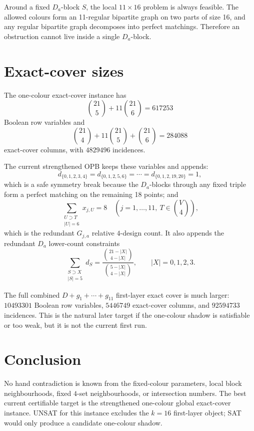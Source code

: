 \documentclass[11pt]{article}
\newcommand{\binomV}[2]{\binom{#1}{#2}}
\begin{document}
Around a fixed \(D_a\)-block \(S\), the local \(11\times16\) problem is always
feasible.  The allowed colours form an 11-regular bipartite graph on two parts
of size 16, and any regular bipartite graph decomposes into perfect matchings.
Therefore an obstruction cannot live inside a single \(D_a\)-block.

\section*{Exact-cover sizes}

The one-colour exact-cover instance has
\[
  \binom{21}{5}+11\binom{21}{6}=617253
\]
Boolean row variables and
\[
  \binom{21}{4}+11\binom{21}{5}+\binom{21}{6}=284088
\]
exact-cover columns, with \(4829496\) incidences.

The current strengthened OPB keeps these variables and appends:
\[
  d_{\{0,1,2,3,4\}}=
  d_{\{0,1,2,5,6\}}=\cdots=
  d_{\{0,1,2,19,20\}}=1,
\]
which is a safe symmetry break because the \(D_a\)-blocks through any fixed
triple form a perfect matching on the remaining 18 points; and
\[
  \sum_{\substack{U\supset T\\ |U|=6}} x_{j,U}=8
  \quad
  (j=1,\ldots,11,\ T\in\binomV{V}{4}),
\]
which is the redundant \(G_{j,a}\) relative \(4\)-design count.
It also appends the redundant \(D_a\) lower-count constraints
\[
  \sum_{\substack{S\supset X\\ |S|=5}} d_S
  =
  \frac{\binom{21-|X|}{4-|X|}}{\binom{5-|X|}{4-|X|}},
  \qquad |X|=0,1,2,3.
\]

The full combined \(D+g_1+\cdots+g_{11}\) first-layer exact cover is much
larger: \(10493301\) Boolean row variables, \(5446749\) exact-cover columns,
and \(92594733\) incidences.  This is the natural later target if the
one-colour shadow is satisfiable or too weak, but it is not the current first
run.

\section*{Conclusion}

No hand contradiction is known from the fixed-colour parameters, local block
neighbourhoods, fixed \(4\)-set neighbourhoods, or intersection numbers.  The
best current certifiable target is the strengthened one-colour global
exact-cover instance.  UNSAT for this instance excludes the \(k=16\)
first-layer object; SAT would only produce a candidate one-colour shadow.
\end{document}

